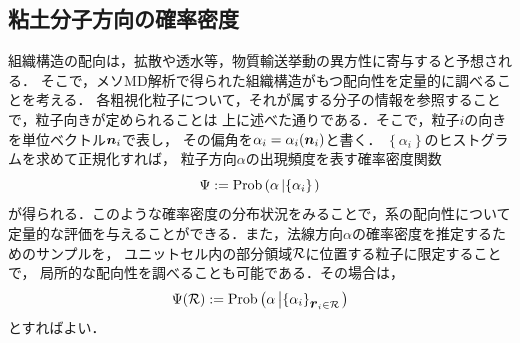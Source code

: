 \subsection{粘土分子方向の確率密度}
組織構造の配向は，拡散や透水等，物質輸送挙動の異方性に寄与すると予想される．
そこで，メソMD解析で得られた組織構造がもつ配向性を定量的に調べることを考える．
各粗視化粒子について，それが属する分子の情報を参照することで，粒子向きが定められることは
上に述べた通りである．そこで，粒子$i$の向きを単位ベクトル$\mbox{\boldmath $n$}_i$で表し，
その偏角を$\alpha_i = \alpha_i( \mbox{\boldmath $n$}_i)$と書く．
$\left\{ \alpha_i \right\}$のヒストグラムを求めて正規化すれば，
粒子方向$\alpha$の出現頻度を表す確率密度関数
\begin{equation}
	\Psi:=
	{\rm Prob}
	\left(\alpha \left| \left\{\alpha_i \right\} \right. \right)
	\label{eqn:PDF}
\end{equation}
が得られる．このような確率密度の分布状況をみることで，系の配向性について
定量的な評価を与えることができる．また，法線方向$\alpha$の確率密度を推定するためのサンプルを，
ユニットセル内の部分領域$\cal R$に位置する粒子に限定することで，
局所的な配向性を調べることも可能である．その場合は，
\begin{equation}
	\Psi({\cal R}):=
	{\rm Prob} \left(\alpha \left| \left\{\alpha_i \right\}_{\mbox{\boldmath $r$}_i\in {\cal R}} \right. \right)
	\label{eqn:PDF_R}
\end{equation}
とすればよい．
